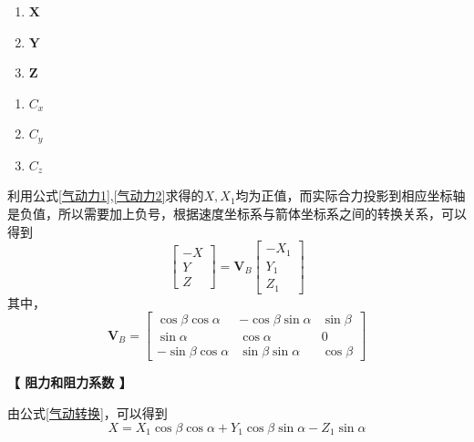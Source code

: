 \begin{minipage}{0.5\linewidth}
	\begin{enumerate}[]
		\item $\bm{X}$ \quad {}\vspace*{-0.5em}
		\item $\bm{Y}$ \quad {}\vspace*{-0.5em}
		\item $\bm{Z}$ \quad {}\vspace*{-0.5em}
	\end{enumerate}
\end{minipage}
\begin{minipage}{0.5\linewidth}
	\begin{enumerate}[]
		\item $C_{x}$ \quad {}\vspace*{-0.5em}
		\item $C_{y}$ \quad {}\vspace*{-0.5em}
		\item $C_{z}$ \quad {}
	\end{enumerate}
\end{minipage}
\vspace*{1em}

利用公式\eqref{气动力1},\eqref{气动力2}求得的$X,X_1$均为正值，而实际合力投影到相应坐标轴是负值，所以需要加上负号，根据速度坐标系与箭体坐标系之间的转换关系，可以得到
\begin{equation}
	\begin{bmatrix}
		-X \\
		Y \\
		Z
	\end{bmatrix}
	=
	\bm{V}_B
	\begin{bmatrix}
		-X_1 \\
		Y_1 \\
		Z_1
	\end{bmatrix}
	\label{气动转换}
\end{equation}
其中，
\begin{equation}
	\bm{V}_B = 
	\begin{bmatrix}
		\cos \beta \cos \alpha & - \cos \beta \sin \alpha & \sin \beta \\
		\sin \alpha & \cos \alpha & 0 \\
		- \sin \beta \cos \alpha & \sin \beta \sin \alpha & \cos \beta
	\end{bmatrix}
\end{equation}

\noindent \textbf{【  阻力和阻力系数  】}

由公式\eqref{气动转换}，可以得到
\begin{equation}
	X = X_1 \cos \beta \cos \alpha + Y_1 \cos \beta \sin \alpha - Z_1 \sin \alpha
\end{equation}








